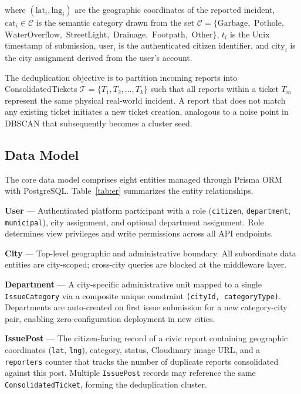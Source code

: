 \documentclass[conference]{IEEEtran}
\begin{document}
\noindent where $(\text{lat}_i, \text{lng}_i)$ are the geographic coordinates of the reported incident, $\text{cat}_i \in \mathcal{C}$ is the semantic category drawn from the set $\mathcal{C} = \{\text{Garbage},$ $\text{Pothole},$ $\text{WaterOverflow},$ $\text{StreetLight},$ $\text{Drainage},$ $\text{Footpath},$ $\text{Other}\}$, $t_i$ is the Unix timestamp of submission, $\text{user}_i$ is the authenticated citizen identifier, and $\text{city}_i$ is the city assignment derived from the user's account.

The deduplication objective is to partition incoming reports into ConsolidatedTickets $\mathcal{T} = \{T_1, T_2, \ldots, T_k\}$ such that all reports within a ticket $T_m$ represent the same physical real-world incident. A report that does not match any existing ticket initiates a new ticket creation, analogous to a noise point in DBSCAN that subsequently becomes a cluster seed.

\subsection{Data Model}

The core data model comprises eight entities managed through Prisma ORM with PostgreSQL. Table~\ref{tab:er} summarizes the entity relationships.

\textbf{User} --- Authenticated platform participant with a role (\texttt{citizen}, \texttt{department}, \texttt{municipal}), city assignment, and optional department assignment. Role determines view privileges and write permissions across all API endpoints.

\textbf{City} --- Top-level geographic and administrative boundary. All subordinate data entities are city-scoped; cross-city queries are blocked at the middleware layer.

\textbf{Department} --- A city-specific administrative unit mapped to a single \texttt{IssueCategory} via a composite unique constraint \texttt{(cityId, categoryType)}. Departments are auto-created on first issue submission for a new category-city pair, enabling zero-configuration deployment in new cities.

\textbf{IssuePost} --- The citizen-facing record of a civic report containing geographic coordinates (\texttt{lat}, \texttt{lng}), category, status, Cloudinary image URL, and a \texttt{reporters} counter that tracks the number of duplicate reports consolidated against this post. Multiple \texttt{IssuePost} records may reference the same \texttt{ConsolidatedTicket}, forming the deduplication cluster.
\end{document}
